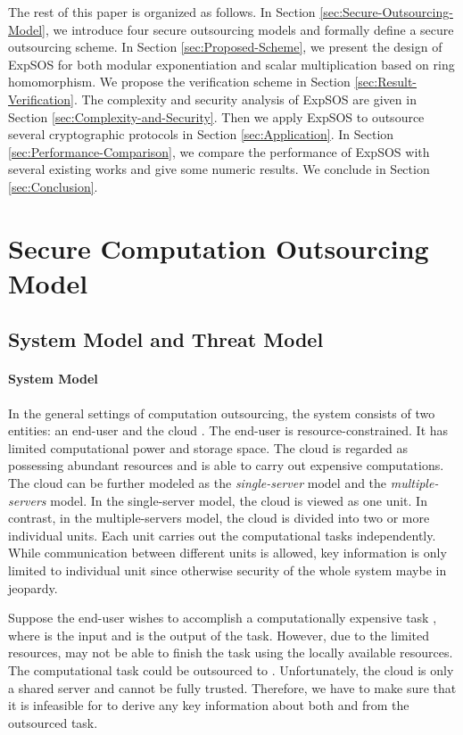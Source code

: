 \documentclass[english,draftcls,onecolumn,11pt]{IEEEtran}
\theoremstyle{definition}
\theoremstyle{plain}
\theoremstyle{plain}
\theoremstyle{definition}
\begin{document}
The rest of this paper is organized as follows. In Section \ref{sec:Secure-Outsourcing-Model},
we introduce four secure outsourcing models and formally define a
secure outsourcing scheme. In Section \ref{sec:Proposed-Scheme},
we present the design of ExpSOS for both modular exponentiation and
scalar multiplication based on ring homomorphism. We propose the verification
scheme in Section \ref{sec:Result-Verification}. The complexity and
security analysis of ExpSOS are given in Section \ref{sec:Complexity-and-Security}.
Then we apply ExpSOS to outsource several cryptographic protocols
in Section \ref{sec:Application}. In Section \ref{sec:Performance-Comparison},
we compare the performance of ExpSOS with several existing works and
give some numeric results. We conclude in Section \ref{sec:Conclusion}.


\section{Secure Computation Outsourcing Model\label{sec:Secure-Outsourcing-Model}}


\subsection{System Model and Threat Model}


\paragraph{System Model}

In the general settings of computation outsourcing, the system consists
of two entities: an end-user  and the cloud . The end-user
 is resource-constrained. It has limited computational power and
storage space. The cloud  is regarded as possessing abundant resources
and is able to carry out expensive computations. The cloud can be
further modeled as the \textit{single-server} model and the \textit{multiple-servers}
model. In the single-server model, the cloud is viewed as one unit.
In contrast, in the multiple-servers model, the cloud is divided into
two or more individual units. Each unit carries out the computational
tasks independently. While communication between different units is
allowed, key information is only limited to individual unit since
otherwise security of the whole system maybe in jeopardy. 

Suppose the end-user  wishes to accomplish a computationally expensive
task , where  is the
input and  is the output of the task. However, due to the
limited resources,  may not be able to finish the task using the
locally available resources. The computational task  could be
outsourced to . Unfortunately, the cloud is only a shared server
and cannot be fully trusted. Therefore, we have to make sure that
it is infeasible for  to derive any key information about both
 and  from the outsourced task. 
\end{document}
